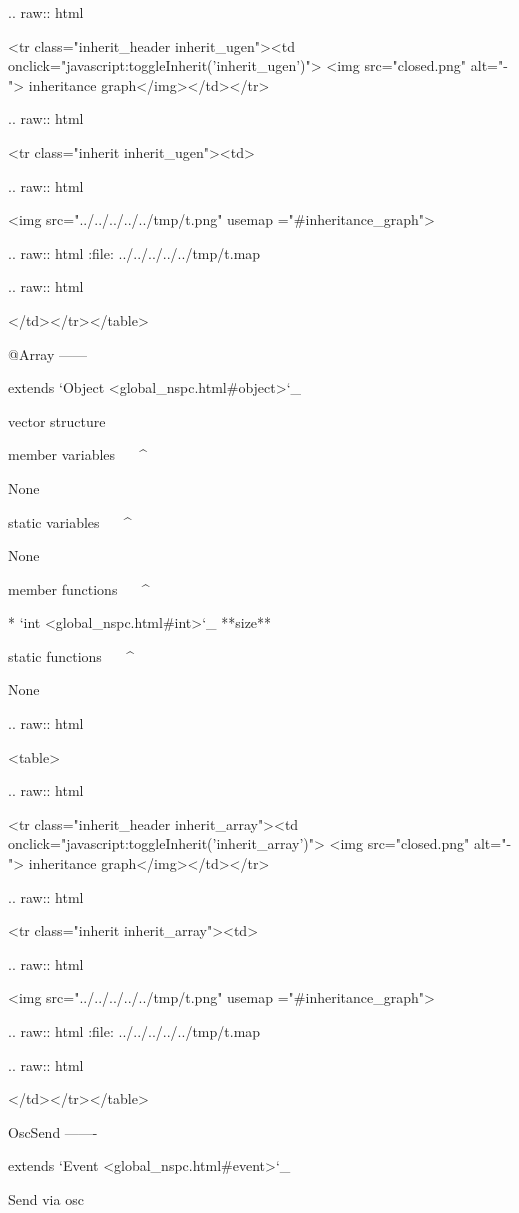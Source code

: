   .. raw:: html

   <tr class="inherit_header inherit_ugen"><td onclick="javascript:toggleInherit('inherit_ugen')"> <img src="closed.png" alt="-"> inheritance graph</img></td></tr>


  .. raw:: html

   <tr class="inherit inherit_ugen"><td>


  .. raw:: html

   <img src="../../../../../tmp/t.png" usemap ="#inheritance_graph">


  .. raw:: html
   :file:   ../../../../../tmp/t.map


  .. raw:: html

   </td></tr></table>

@Array
------

extends `Object <global_nspc.html#object>`_ 

vector structure

member variables
^^^^^^^^^^^^^^^^

	None

static variables
^^^^^^^^^^^^^^^^

	None

member functions
^^^^^^^^^^^^^^^^

	* `int <global_nspc.html#int>`_ **size**

static functions
^^^^^^^^^^^^^^^^


	None


  .. raw:: html

   <table>


  .. raw:: html

   <tr class="inherit_header inherit_array"><td onclick="javascript:toggleInherit('inherit_array')"> <img src="closed.png" alt="-"> inheritance graph</img></td></tr>


  .. raw:: html

   <tr class="inherit inherit_array"><td>


  .. raw:: html

   <img src="../../../../../tmp/t.png" usemap ="#inheritance_graph">


  .. raw:: html
   :file:   ../../../../../tmp/t.map


  .. raw:: html

   </td></tr></table>

OscSend
-------

extends `Event <global_nspc.html#event>`_ 

Send via osc


